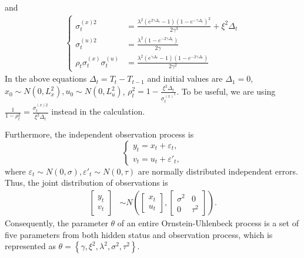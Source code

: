 and 
\begin{align*}
\begin{cases}
\sigma_t^{(x)2} &=\frac{\lambda^2 \left(e^{2 \gamma\Delta_t}-1\right) \left(1 -e^{-\gamma\Delta_t}\right)^2}{2 \gamma ^3 } + \xi^2\Delta_t\\
\sigma_t^{(u)2} &= \frac{\lambda ^2 \left(1- e^{-2 \gamma\Delta_t}\right)}{2 \gamma } \\
\rho_t\sigma_t^{(x)}\sigma_t^{(u)} & =\frac{\lambda ^2 \left(e^{\gamma\Delta_t} -1\right) \left(1-e^{-2\gamma\Delta_t}\right)}{2 \gamma ^2}
\end{cases}
\end{align*}
In the above equations $\Delta_t = T_t-T_{t-1}$ and initial values are $\Delta_1=0$, $x_0\sim N\left(0,L_x^2\right), u_0\sim N(0,L_u^2)$, $\rho_t^2 = 1-\frac{\xi^2 \Delta_t}{\sigma_t^{(x)^2}}$. To be useful, we are using $\frac{1}{1-\rho_t^2} =\frac{\sigma_t^{(x)2}}{\xi^2 \Delta_t}$ instead in the calculation. 

Furthermore, the independent observation process is 
\begin{equation}\label{obseq}
\begin{cases} y_t=x_t+\varepsilon_t,\\ v_t=u_t+\varepsilon'_t, \end{cases} 
\end{equation}
where $\varepsilon_t\sim N(0,\sigma),\varepsilon'_t\sim N(0,\tau)$ are normally distributed independent errors. Thus, the joint distribution of observations is 
\begin{align}\label{obmodel}
\begin{bmatrix} y_t \\ v_t \end{bmatrix} &\sim N\left(
\begin{bmatrix}x_t \\ u_t \end{bmatrix} , 
\begin{bmatrix}
\sigma^2 & 0\\
0 & \tau^2
\end{bmatrix} \right).
\end{align}
Consequently, the parameter $\theta$ of an entire Ornstein-Uhlenbeck process is a set of five parameters from both hidden status and observation process, which is represented as $\theta = \left\lbrace \gamma,\xi^2,\lambda^2,\sigma^2,\tau^2 \right\rbrace$. 


